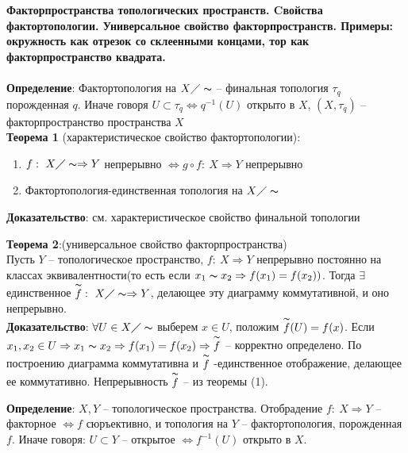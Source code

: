 \section{}
	\textbf{Факторпространства топологических пространств. Cвойства фактортопологии. Универсальное свойство факторпространств. Примеры: окружность как отрезок со склеенными концами, тор как факторпространство квадрата.}\\
	\\
	\textbf{Определение}: Фактортопология на $X\diagup \thicksim$ -- финальная топология ${\tau}_{q}$ порожденная $q$. Иначе говоря $U\subset {\tau}_{q} \Leftrightarrow q^{-1}(U)$ открыто в $X$, $(X, {\tau}_{q})$ -- факторпространство пространства $X$\\
	\textbf{Теорема 1} (характеристическое свойство фактортопологии):
	\begin{enumerate}
		\item 
		$f:\ X\diagup \thicksim \Rightarrow Y$ непрерывно $\Leftrightarrow g \circ f:\ X \Rightarrow Y$ непрерывно
		\item 
		Фактортопология-единственная топология на $X\diagup \thicksim $
	\end{enumerate}
	\textbf{Доказательство}: см. характеристическое свойство финальной топологии
	\begin{figure}[h]
	\end{figure}
	\textbf{Теорема 2}:(универсальное свойство факторпространства)\\
	Пусть $Y$ -- топологическое пространство, $f:\ X\Rightarrow Y$ непрерывно постоянно на классах эквивалентности(то есть если $x_1 \thicksim x_2 \Rightarrow f(x_1) = f(x_2))$. Тогда $\exists$ единственное $\overset{\thicksim}{f}:\ X\diagup \thicksim \Rightarrow Y$, делающее эту диаграмму коммутативной, и оно непрерывно.\\
	\textbf{Доказательство}: $\forall U\in X\diagup \thicksim$ выберем $x\in U$, положим $\overset{\thicksim}{f}(U)=f(x)$. Если $x_1, x_2 \in U \Rightarrow x_1 \thicksim x_2 \Rightarrow f(x_1) = f(x_2) \Rightarrow \overset{\thicksim}{f}$ -- корректно определено. По построению диаграмма коммутативна и $\overset{\thicksim}{f}$ -единственное отображение, делающее ее коммутативно. Непрерывность $\overset{\thicksim}{f}$ -- из теоремы (1).
	\begin{figure}[h]
	\end{figure}
	\textbf{Определение}: $X, Y$ -- топологическое пространства. Отобрадение $f:\ X \Rightarrow Y$ -- факторное $\Leftrightarrow f$ сюръективно, и топология на $Y$ -- фактортопология, порожденная $f$. Иначе говоря: $U\subset Y$ -- открытое $\Leftrightarrow f^{-1}(U)$ открыто в $X$.\\

